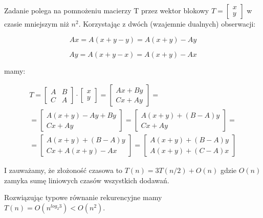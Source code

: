 Zadanie polega na pomnożeniu macierzy T przez wektor blokowy $ T = \left[ \begin{matrix}x \\ y\end{matrix} \right] $ w czasie mniejszym niż $n^2$. Korzystając z dwóch (wzajemnie dualnych) obserwacji:

$$Ax = A(x + y - y) = A(x+y) - Ay$$

$$Ay = A(x + y - x) = A(x+y) - Ax$$


mamy:


\begin{equation*}
\begin{split}
T = \left[ \begin{matrix}A & B\\ C & A\end{matrix} \right] \cdot \left[ \begin{matrix} x \\ y\end{matrix} \right] = \left[ \begin{matrix} Ax + By\\ Cx + Ay\end{matrix} \right] = \\
= \left[ \begin{matrix}A(x+y)-Ay + By\\ Cx + Ay\end{matrix} \right] = \left[ \begin{matrix}A(x+y)+(B - A)y\\ Cx + Ay\end{matrix} \right] = \\
= \left[ \begin{matrix}A(x+y)+(B - A)y\\ Cx + A(x+y) - Ax \end{matrix} \right] =  \left[ \begin{matrix}A(x+y)+(B - A)y\\ A(x+y) + (C-A)x\end{matrix} \right]
\end{split}
\end{equation*}

I zauważamy, że złożoność czasowa to $T(n) = 3 T(n/2) + O(n)$ gdzie $O(n)$ zamyka sumę liniowych czasów wszystkich dodawań.

Rozwiązując typowe równanie rekurencyjne mamy $T(n) = O(n^{log_2 3}) < O(n^2)$.


\section{} %
\section{} %
